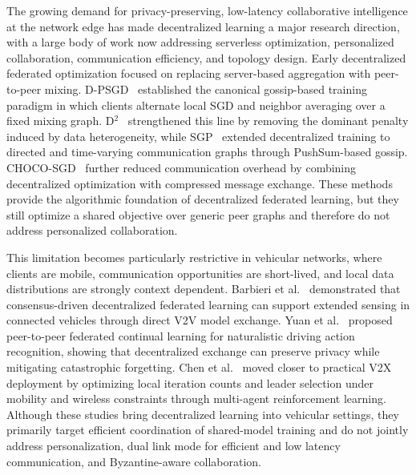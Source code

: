 The growing demand for privacy-preserving, low-latency collaborative intelligence at the network edge has made decentralized learning a major research direction, with a large body of work now addressing serverless optimization, personalized collaboration, communication efficiency, and topology design. Early decentralized federated optimization focused on replacing server-based aggregation with peer-to-peer mixing. D-PSGD~\cite{lian2017dsgd} established the canonical gossip-based training paradigm in which clients alternate local SGD and neighbor averaging over a fixed mixing graph. D$^2$~\cite{tang2018d2} strengthened this line by removing the dominant penalty induced by data heterogeneity, while SGP~\cite{assran2019sgp} extended decentralized training to directed and time-varying communication graphs through PushSum-based gossip. CHOCO-SGD~\cite{koloskova2019choco} further reduced communication overhead by combining decentralized optimization with compressed message exchange. These methods provide the algorithmic foundation of decentralized federated learning, but they still optimize a shared objective over generic peer graphs and therefore do not address personalized collaboration.

This limitation becomes particularly restrictive in vehicular networks, where clients are mobile, communication opportunities are short-lived, and local data distributions are strongly context dependent. Barbieri et al.~\cite{barbieri2022extended} demonstrated that consensus-driven decentralized federated learning can support extended sensing in connected vehicles through direct V2V model exchange. Yuan et al.~\cite{yuan2023p2p} proposed peer-to-peer federated continual learning for naturalistic driving action recognition, showing that decentralized exchange can preserve privacy while mitigating catastrophic forgetting. Chen et al.~\cite{chen2025mobility} moved closer to practical V2X deployment by optimizing local iteration counts and leader selection under mobility and wireless constraints through multi-agent reinforcement learning. Although these studies bring decentralized learning into vehicular settings, they primarily target efficient coordination of shared-model training and do not jointly address personalization, dual link mode for efficient and low latency communication, and Byzantine-aware collaboration.


